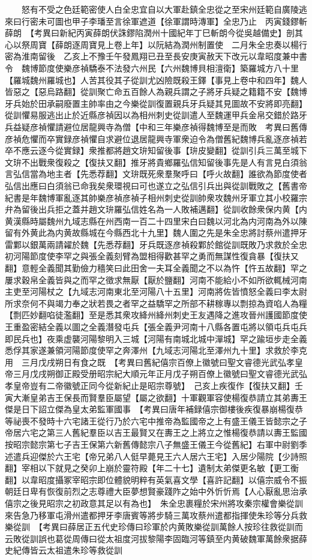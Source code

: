 　　怒有不受之色廷範密使人白全忠宜自以大軍赴鎮全忠從之至宋州廷範自廣陵逃來曰行密未可圖也甲子李璠至言徐軍遮道【徐軍謂時漙軍】全忠乃止　丙寅錢鏐斬薛朗　【考異曰新紀丙寅薛朗伏誅鏐陷潤州十國紀年丁巳斬朗今從吳越備史】剖其心以祭周寶【薛朗逐周寶見上卷上年】以阮結為潤州制置使　二月朱全忠奏以楊行密為淮南留後　乙亥上不豫壬午發鳳翔已丑至長安庚寅赦天下改元以韋昭度兼中書令　魏博節度使樂彦禎驕泰不法發六州民【六州魏博貝相澶衛】築羅城方八十里【羅城魏州羅城也】人苦其役其子從訓尤凶險既殺王鐸【事見上卷中和四年】魏人皆惡之【惡烏路翻】從訓聚亡命五百餘人為親兵謂之子將牙兵疑之籍籍不安【魏博牙兵始於田承嗣廢置主帥率由之今樂從訓復置親兵牙兵疑其見圖故不安將即亮翻】從訓懼易服逃出止於近縣彦禎因以為相州刺史從訓遣人至魏運甲兵金帛交錯於路牙兵益疑彦禎懼請避位居龍興寺為僧【中和三年樂彦禎得魏博至是而敗　考異曰舊傳彦禎危懼而卒實録彦禎懼自求避位退居龍興寺軍衆迫令為僧舊紀魏博兵亂逐彦禎若卒不應云逐今從實録】衆推都將趙文㺹知留後事【㺹皮變翻】從訓引兵三萬至城下文㺹不出戰衆復殺之【復扶又翻】推牙將貴鄉羅弘信知留後事先是人有言見白須翁言弘信當為地主者【先悉荐翻】文㺹既死衆羣聚呼曰【呼火故翻】誰欲為節度使者弘信出應曰白須翁已命我矣衆環視曰可也遂立之弘信引兵出與從訓戰敗之【舊書帝紀書是年魏博軍亂逐其帥樂彦禎彦禎子相州刺史從訓帥衆攻魏州牙軍立其小校羅宗弁為留後出兵拒之蓋并趙文㺹羅弘信姓名為一人敗補邁翻】從訓收餘衆保内黄【内黄漢縣時屬魏州九域志縣在州西南一百二十四里宋白曰魏以河北為内河南為外以陳留有外黄此為内黄故縣城在今縣西北十九里】魏人圍之先是朱全忠將討蔡州遣押牙雷鄴以銀萬兩請糴於魏【先悉荐翻】牙兵既逐彦禎殺鄴於館從訓既敗乃求救於全忠　初河陽節度使李罕之與張全義刻臂為盟相得歡甚罕之勇而無謀性復貪暴【復扶又翻】意輕全義聞其勤儉力穡笑曰此田舍一夫耳全義聞之不以為忤【忤五故翻】罕之屢求穀帛全義皆與之而罕之徵求無厭【厭於鹽翻】河南不能給小不如所欲輒械河南主吏至河陽杖之【九域志河南東北至河陽八十五里】河南將佐皆憤怒全義曰李太尉所求奈何不與竭力奉之狀若畏之者罕之益驕罕之所部不耕稼專以剽掠為資啗人為糧【剽匹妙翻啗徒濫翻】至是悉其衆攻絳州絳州刺史王友遇降之進攻晉州護國節度使王重盈密結全義以圖之全義潛發屯兵【張全義尹河南十八縣各置屯將以領屯兵屯兵即民兵也】夜乘虚襲河陽黎明入三城【河陽有南城北城中潬城】罕之踰垣步走全義悉俘其家遂兼領河陽節度使罕之奔澤州【九域志河陽北至澤州九十里】求救於李克用　三月戊戌朔日有食之既　【考異曰舊紀僖宗百僚上徽號曰聖文睿德光武弘孝皇帝三月戊戌朔御正殿受册昭宗紀大順元年正月戊子朔百僚上徽號曰聖文睿德光武弘孝皇帝豈有二帝徽號正同今從新紀止是昭宗尊號】　己亥上疾復作【復扶又翻】壬寅大漸皇弟吉王保長而賢羣臣屬望【屬之欲翻】十軍觀軍容使楊復恭請立其弟夀王傑是日下詔立傑為皇太弟監軍國事　【考異曰唐年補録僖宗御樓後疾復暴崩楊復恭等祕喪不發時十六宅諸王從行乃於六宅中推帝為監國帝之上有盛王儀王皆懿宗之子帝居六宅之第三人舊紀羣臣以吉王最賢又在夀王之上將立之惟楊復恭請以夀王監國按昭宗懿宗第七子吉王保第六新舊傳懿宗八子無盛王儀王今從舊紀】右軍中尉劉季述遣兵迎傑於六王宅【帝兄弟八人侹早薨見王六人居六王宅】入居少陽院【少詩照翻】宰相以下就見之癸卯上崩於靈符殿【年二十七】遺制太弟傑更名敏【更工衡翻】以韋昭度攝冢宰昭宗即位體貌明粹有英氣喜文學【喜許記翻】以僖宗威令不振朝廷日卑有恢復前烈之志尊禮大臣夢想賢豪踐阼之始中外忻忻焉【人心厭亂思治承僖宗之後見昭宗之初政意其足以有為也】　朱全忠裹糧於宋州將攻秦宗權會樂從訓來告急乃移軍屯滑州遣都押牙李唐賓等將步騎三萬攻蔡州遣都指揮使朱珍等分兵救樂從訓　【考異曰薛居正五代史珍傳曰珍軍於内黄敗樂從訓萬餘人按珍往救從訓而云敗從訓誤也葛從周傳曰從太祖度河拔黎陽李固臨河等鎮至内黄破魏軍萬餘衆据薛史紀傳皆云太祖遣朱珍等救從訓